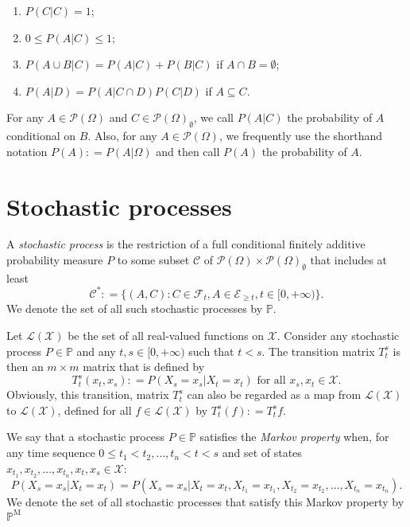 \documentclass[a4paper,reqno]{amsart}
\newcommand{\states}{\mathcal{X}}
\newcommand{\paths}{\Omega}
\newcommand{\power}{\mathcal{P}(\paths)}
\newcommand{\nonemptypower}{\power_{\emptyset}}
\newcommand{\events}{\mathcal{E}}
\newcommand{\filter}[1][t]{\mathcal{F}_{#1}}
\newcommand{\processes}{\mathbb{P}}
\newcommand{\mprocesses}{\processes^{\mathrm{M}}}
\newcommand{\gambles}{\mathcal{L}}
\newcommand{\gamblesX}{\gambles(\states)}
\newcommand{\coloneqq}{:\!=}
\begin{document}
\begin{enumerate}[label=F\arabic*:]
\item
$P(C\vert C)=1$;
\item
$0\leq P(A\vert C)\leq 1$;
\item
$P(A\cup B\vert C)=P(A\vert C)+P(B\vert C)$ if $A\cap B=\emptyset$;
\item
$P(A\vert D)=P(A\vert C\cap D)P(C\vert D)$ if $A\subseteq C$.
\end{enumerate}
\vspace{5pt}

\noindent
For any $A\in\power$ and $C\in\nonemptypower$, we call $P(A\vert C)$ the probability of $A$ conditional on $B$. Also, for any $A\in\power$, we frequently use the shorthand notation $P(A)\coloneqq P(A\vert\paths)$ and then call $P(A)$ the probability of $A$.

\section{Stochastic processes}

A \emph{stochastic process} is the restriction of a full conditional finitely additive probability measure $P$ to some subset $\mathcal{C}$ of $\power\times\nonemptypower$ that includes at least
\begin{equation*}
\mathcal{C^*}\coloneqq\big\{
(A,C)
\colon
C\in\filter, A\in\events_{\geq t}, t\in[0,+\infty)
\big\}.
\end{equation*}
We denote the set of all such stochastic processes by $\processes$.

Let $\gamblesX$ be the set of all real-valued functions on $\states$. Consider any stochastic process $P\in\processes$ and any $t,s\in[0,+\infty)$ such that $t<s$. The transition matrix $T_t^s$ is then an $m\times m$ matrix that is defined by
\begin{equation*}
T_t^s(x_t,x_s)\coloneqq P(X_s=x_s\vert X_t=x_t)\text{ for all $x_s,x_t\in\states$}.
\end{equation*}
Obviously, this transition, matrix $T_t^s$ can also be regarded as a map from $\gamblesX$ to $\gamblesX$, defined for all $f\in\gamblesX$ by $T_t^s(f)\coloneqq T_t^sf$.

We say that a stochastic process $P\in\processes$ satisfies the \emph{Markov property} when, for any time sequence $0\leq t_1<t_2,\dots,t_{n}<t<s$ and set of states $x_{t_1},x_{t_2},\dots,x_{t_n},x_t,x_s\in\states$:
\begin{equation*}
P(X_s=x_s\vert X_t=x_t)=P(X_s=x_s\vert X_t=x_t,X_{t_1}=x_{t_1},X_{t_2}=x_{t_2}, \dots, X_{t_n}=x_{t_n}).
\end{equation*}
We denote the set of all stochastic processes that satisfy this Markov property by $\mprocesses$
\end{document}
